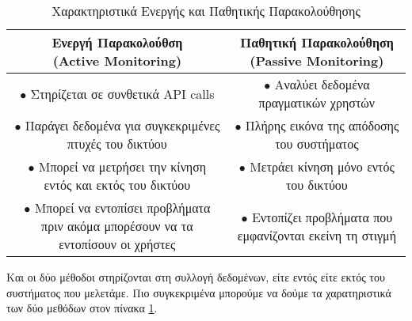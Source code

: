 \begin{table}
	\begin{center}
		\caption{Χαρακτηριστικά Ενεργής και Παθητικής Παρακολούθησης}
		\label{tab:active_and_passive_monitoring}
		\begin{tabular}{ | c | c | }
			\hline
				\thead{Ενεργή Παρακολούθση \\ (Active Monitoring)} & \thead{Παθητική Παρακολούθηση \\ (Passive Monitoring)} \\
			\hline
				\makecell{$\bullet$ Στηρίζεται σε συνθετικά \\ API calls} & \makecell{$\bullet$ Αναλύει δεδομένα πραγματικών \\ χρηστών} \\
				\makecell{$\bullet$ Παράγει δεδομένα για συγκεκριμένες \\ πτυχές του δικτύου} & \makecell{$\bullet$ Πλήρης εικόνα της απόδοσης \\ του συστήματος} \\
				\makecell{$\bullet$ Μπορεί να μετρήσει την κίνηση \\ εντός και εκτός του δικτύου} & \makecell{$\bullet$ Μετράει κίνηση μόνο \\ εντός του δικτύου} \\
				\makecell{$\bullet$ Μπορεί να εντοπίσει προβλήματα \\ πριν ακόμα μπορέσουν να τα \\ εντοπίσουν οι χρήστες} & \makecell{$\bullet$ Εντοπίζει προβλήματα που \\ εμφανίζονται εκείνη τη στιγμή} \\
			\hline
		\end{tabular}
	\end{center}
\end{table}

Και οι δύο μέθοδοι στηρίζονται στη συλλογή δεδομένων, είτε εντός είτε εκτός του συστήματος που μελετάμε. Πιο συγκεκριμένα μπορούμε να δούμε τα χαρατηριστικά των δύο μεθόδων στον πίνακα \ref{tab:active_and_passive_monitoring}.


